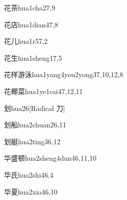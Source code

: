 \begin{entry}{花茶}{hua1cha2}{7,9}
\end{entry}

\begin{entry}{花店}{hua1dian4}{7,8}
\end{entry}

\begin{entry}{花儿}{hua1r5}{7,2}
\end{entry}

\begin{entry}{花生}{hua1sheng1}{7,5}
\end{entry}

\begin{entry}{花样游泳}{hua1yang4you2yong3}{7,10,12,8}
\end{entry}

\begin{entry}{花椰菜}{hua1ye1cai4}{7,12,11}
\end{entry}

\begin{entry}{划}{hua2}{6}[Radical 刀]
\end{entry}

\begin{entry}{划船}{hua2chuan2}{6,11}
\end{entry}

\begin{entry}{划艇}{hua2ting3}{6,12}
\end{entry}

\begin{entry}{华盛顿}{hua2sheng4dun4}{6,11,10}
\end{entry}

\begin{entry}{华氏}{hua2shi4}{6,4}
\end{entry}

\begin{entry}{华夏}{hua2xia4}{6,10}
\end{entry}

